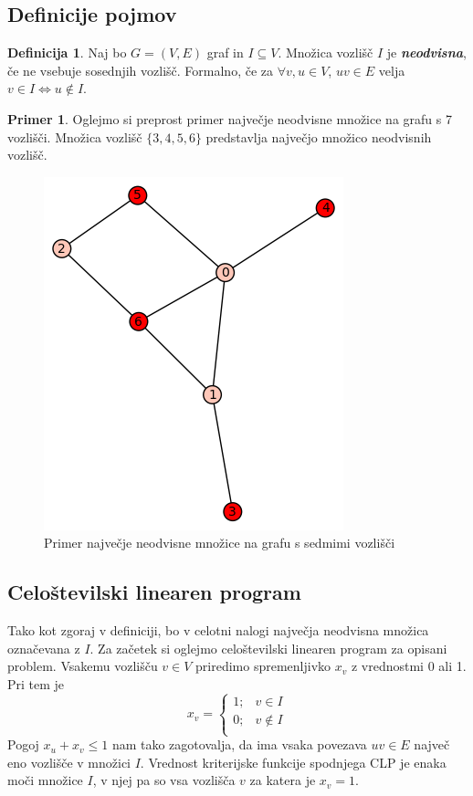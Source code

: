 \documentclass[a4paper, 12 pt]{article}
\theoremstyle{definition}
\newtheorem*{definicija}{Definicija}
\newtheorem*{primer}{Primer}
\theoremstyle{plain}
\theoremstyle{remark}
\begin{document}
\subsection{Definicije pojmov}

\begin{definicija}Naj bo $G = (V, E)$ graf in $I \subseteq V$. Množica vozlišč $I$ je \textbf{\textit{neodvisna}}, če ne vsebuje sosednjih vozlišč. 
\newline Formalno, če za $\forall v, u \in V$, $uv \in E$ velja $v \in I \Leftrightarrow  u \notin I$.
\end{definicija}

\begin{primer}
Oglejmo si preprost primer največje neodvisne množice na grafu s 7 vozlišči. Množica vozlišč $\{3, 4, 5, 6\}$ predstavlja največjo množico neodvisnih vozlišč.
\begin{figure}[H]
\centering
  \includegraphics[scale=0.4]{neodvisna_zgled.png}
  \caption{Primer največje neodvisne množice na grafu s sedmimi vozlišči}
  \label{fig:primer7vozlisc} 
\end{figure}
\end{primer}

\subsection{Celoštevilski linearen program}
Tako kot zgoraj v definiciji, bo v celotni nalogi največja neodvisna množica označevana z $I$. Za začetek si oglejmo celoštevilski linearen program za opisani problem.  Vsakemu vozlišču $v \in V$ priredimo spremenljivko $x_v$ z vrednostmi 0 ali 1. Pri tem je 
\[   
x_v = 
     \begin{cases}
       1; &v \in I \\
       0; &v \notin I\\
     \end{cases}
\]
Pogoj $x_u + x_v \leq 1$ nam tako zagotovalja, da ima vsaka povezava $uv \in E$ največ eno vozlišče v množici $I$. Vrednost kriterijske funkcije spodnjega CLP je enaka moči množice $I$, v njej pa so vsa vozlišča $v$ za katera je $x_v = 1$.
\end{document}
